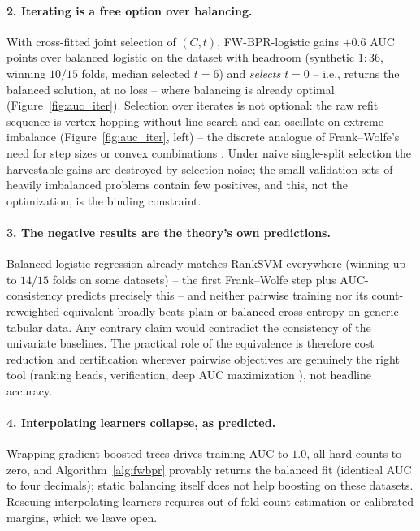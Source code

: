 \documentclass[11pt]{article}
\theoremstyle{remark}
\begin{document}
\paragraph{2. Iterating is a free option over balancing.} With cross-fitted
joint selection of $(C, t)$, FW-BPR-logistic gains $+0.6$ AUC points over
balanced logistic on the dataset with headroom (synthetic $1{:}36$, winning
$10/15$ folds, median selected $t = 6$) and \emph{selects $t = 0$} -- i.e.,
returns the balanced solution, at no loss -- where balancing is already
optimal (Figure~\ref{fig:auc_iter}). Selection over iterates is not
optional: the raw refit sequence is vertex-hopping without line search and
can oscillate on extreme imbalance (Figure~\ref{fig:auc_iter}, left) --
the discrete analogue of Frank--Wolfe's need for step sizes or convex
combinations \citep{jaggi2013}. Under naive single-split selection the
harvestable gains are destroyed by selection noise; the small validation
sets of heavily imbalanced problems contain few positives, and this, not
the optimization, is the binding constraint.

\paragraph{3. The negative results are the theory's own predictions.}
Balanced logistic regression already matches RankSVM everywhere (winning up
to $14/15$ folds on some datasets) -- the first Frank--Wolfe step plus
AUC-consistency \citep{kotlowski2011,agarwal2014} predicts precisely this
-- and neither pairwise training nor its count-reweighted equivalent
broadly beats plain or balanced cross-entropy on generic tabular data. Any
contrary claim would contradict the consistency of the univariate
baselines. The practical role of the equivalence is therefore cost
reduction and certification wherever pairwise objectives are genuinely the
right tool (ranking heads, verification, deep AUC maximization
\citep{yuan2021}), not headline accuracy.

\paragraph{4. Interpolating learners collapse, as predicted.} Wrapping
gradient-boosted trees drives training AUC to $1.0$, all hard counts to
zero, and Algorithm~\ref{alg:fwbpr} provably returns the balanced fit
(identical AUC to four decimals); static balancing itself does not help
boosting on these datasets. Rescuing interpolating learners requires
out-of-fold count estimation or calibrated margins, which we leave open.
\end{document}
